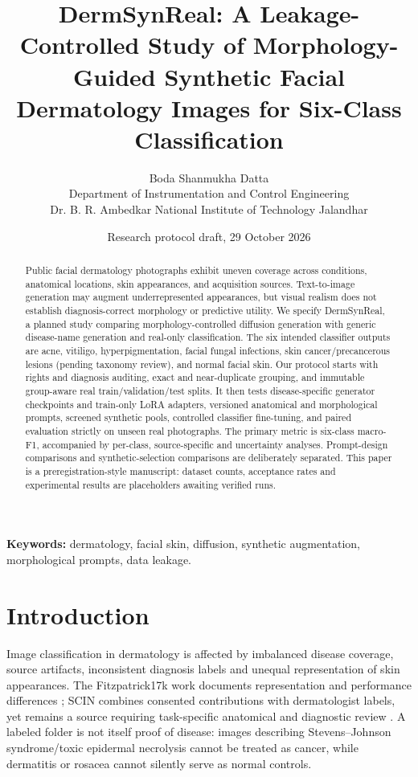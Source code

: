 \documentclass[11pt,a4paper]{article}
\title{\bfseries DermSynReal: A Leakage-Controlled Study of Morphology-Guided Synthetic Facial Dermatology Images for Six-Class Classification}
\author{Boda Shanmukha Datta\\\small Department of Instrumentation and Control Engineering\\\small Dr. B. R. Ambedkar National Institute of Technology Jalandhar}
\date{Research protocol draft, 29 October 2026}
\begin{document}
\maketitle
\begin{center}
\end{center}
\begin{abstract}
Public facial dermatology photographs exhibit uneven coverage across conditions, anatomical locations, skin appearances, and acquisition sources. Text-to-image generation may augment underrepresented appearances, but visual realism does not establish diagnosis-correct morphology or predictive utility. We specify DermSynReal, a planned study comparing morphology-controlled diffusion generation with generic disease-name generation and real-only classification. The six intended classifier outputs are acne, vitiligo, hyperpigmentation, facial fungal infections, skin cancer/precancerous lesions (pending taxonomy review), and normal facial skin. Our protocol starts with rights and diagnosis auditing, exact and near-duplicate grouping, and immutable group-aware real train/validation/test splits. It then tests disease-specific generator checkpoints and train-only LoRA adapters, versioned anatomical and morphological prompts, screened synthetic pools, controlled classifier fine-tuning, and paired evaluation strictly on unseen real photographs. The primary metric is six-class macro-F1, accompanied by per-class, source-specific and uncertainty analyses. Prompt-design comparisons and synthetic-selection comparisons are deliberately separated. This paper is a preregistration-style manuscript: dataset counts, acceptance rates and experimental results are placeholders awaiting verified runs.
\end{abstract}
\textbf{Keywords:} dermatology, facial skin, diffusion, synthetic augmentation, morphological prompts, data leakage.

\section{Introduction}
Image classification in dermatology is affected by imbalanced disease coverage, source artifacts, inconsistent diagnosis labels and unequal representation of skin appearances. The Fitzpatrick17k work documents representation and performance differences \cite{groh2021}; SCIN combines consented contributions with dermatologist labels, yet remains a source requiring task-specific anatomical and diagnostic review \cite{scin}. A labeled folder is not itself proof of disease: images describing Stevens--Johnson syndrome/toxic epidermal necrolysis cannot be treated as cancer, while dermatitis or rosacea cannot silently serve as normal controls.
\end{document}
